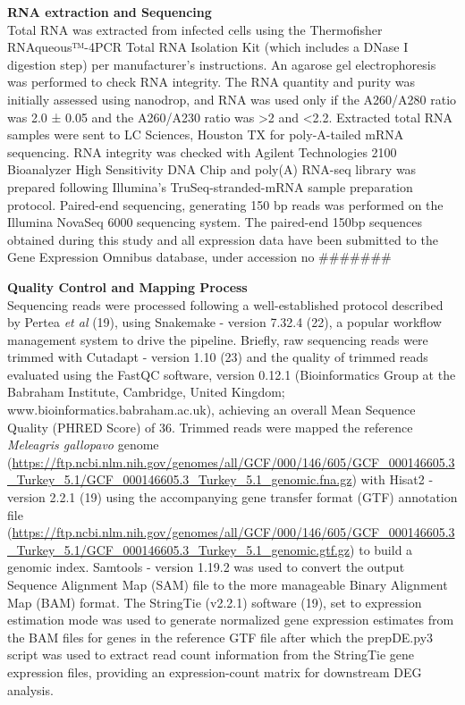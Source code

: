 \documentclass[
]{article}
\begin{document}
\textbf{RNA extraction and Sequencing}\\
Total RNA was extracted from infected cells using the Thermofisher
RNAqueous™-4PCR Total RNA Isolation Kit (which includes a DNase I
digestion step) per manufacturer's instructions. An agarose gel
electrophoresis was performed to check RNA integrity. The RNA quantity
and purity was initially assessed using nanodrop, and RNA was used only
if the A260/A280 ratio was 2.0 ± 0.05 and the A260/A230 ratio was
\textgreater2 and \textless2.2. Extracted total RNA samples were sent to
LC Sciences, Houston TX for poly-A-tailed mRNA sequencing. RNA integrity
was checked with Agilent Technologies 2100 Bioanalyzer High Sensitivity
DNA Chip and poly(A) RNA-seq library was prepared following Illumina's
TruSeq-stranded-mRNA sample preparation protocol. Paired-end sequencing,
generating 150 bp reads was performed on the Illumina NovaSeq 6000
sequencing system. The paired-end 150bp sequences obtained during this
study and all expression data have been submitted to the Gene Expression
Omnibus database, under accession no \#\#\#\#\#\#\#

\textbf{Quality Control and Mapping Process}\\
Sequencing reads were processed following a well-established protocol
described by Pertea \emph{et al} (19), using Snakemake - version 7.32.4
(22), a popular workflow management system to drive the pipeline.
Briefly, raw sequencing reads were trimmed with Cutadapt - version 1.10
(23) and the quality of trimmed reads evaluated using the FastQC
software, version 0.12.1 (Bioinformatics Group at the Babraham
Institute, Cambridge, United Kingdom;
www.bioinformatics.babraham.ac.uk), achieving an overall Mean Sequence
Quality (PHRED Score) of 36. Trimmed reads were mapped the reference
\emph{Meleagris gallopavo} genome
(\url{https://ftp.ncbi.nlm.nih.gov/genomes/all/GCF/000/146/605/GCF_000146605.3_Turkey_5.1/GCF_000146605.3_Turkey_5.1_genomic.fna.gz})
with Hisat2 - version 2.2.1 (19) using the accompanying gene transfer
format (GTF) annotation file
(\url{https://ftp.ncbi.nlm.nih.gov/genomes/all/GCF/000/146/605/GCF_000146605.3_Turkey_5.1/GCF_000146605.3_Turkey_5.1_genomic.gtf.gz})
to build a genomic index. Samtools - version 1.19.2 was used to convert
the output Sequence Alignment Map (SAM) file to the more manageable
Binary Alignment Map (BAM) format. The StringTie (v2.2.1) software (19),
set to expression estimation mode was used to generate normalized gene
expression estimates from the BAM files for genes in the reference GTF
file after which the prepDE.py3 script was used to extract read count
information from the StringTie gene expression files, providing an
expression-count matrix for downstream DEG analysis.
\end{document}
